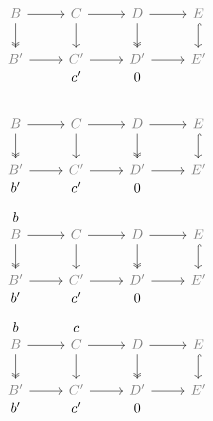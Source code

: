 \documentclass[12pt]{article}
\begin{document}
\begin{equation*}
  \begin{tikzcd}
    \phantom{b}\\[-2em]
    \color{gray}B\rar\dar[two heads] & \color{gray}C\rar\dar & \color{gray}D\rar\dar[two heads] & \color{gray}E\dar[hook] \\
    \color{gray}B'\rar &\color{gray} C'\rar &\color{gray} D'\rar &\color{gray} E' \\[-2em]
    & c' & 0
  \end{tikzcd}
\end{equation*}
\begin{equation*}
  \begin{tikzcd}
    \phantom{b}\\[-2em]
    \color{gray}B\rar\dar[two heads] & \color{gray}C\rar\dar & \color{gray}D\rar\dar[two heads] & \color{gray}E\dar[hook] \\
    \color{gray}B'\rar &\color{gray} C'\rar &\color{gray} D'\rar &\color{gray} E' \\[-2em]
    b' & c' & 0
  \end{tikzcd}
\end{equation*}
\begin{equation*}
  \begin{tikzcd}
    b \\[-2em]
    \color{gray}B\rar\dar[two heads, black] & \color{gray}C\rar\dar & \color{gray}D\rar\dar[two heads] & \color{gray}E\dar[hook] \\
    \color{gray}B'\rar &\color{gray} C'\rar &\color{gray} D'\rar &\color{gray} E' \\[-2em]
    b' & c' & 0
  \end{tikzcd}
\end{equation*}
\begin{equation*}
  \begin{tikzcd}
    b & c \\[-2em]
    \color{gray}B\rar\dar[two heads] & \color{gray}C\rar\dar & \color{gray}D\rar\dar[two heads] & \color{gray}E\dar[hook] \\
    \color{gray}B'\rar &\color{gray} C'\rar &\color{gray} D'\rar &\color{gray} E' \\[-2em]
    b' & c' & 0
  \end{tikzcd}
\end{equation*}
\end{document}
